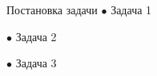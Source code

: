 
\begin{frame}{Постановка задачи}
$\bullet$ Задача 1

$\bullet$ Задача 2

$\bullet$ Задача 3
\end{frame}